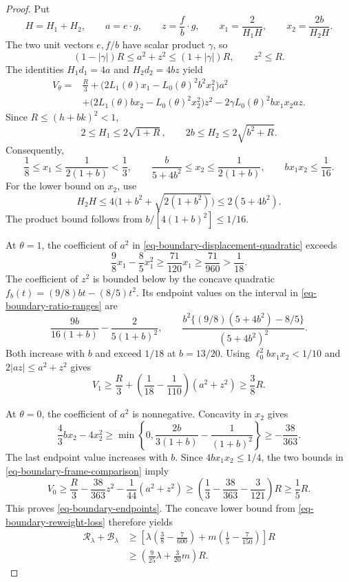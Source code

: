 \documentclass[11pt]{amsart}
\theoremstyle{remark}\newtheorem{remark}[theorem]{Remark}
\numberwithin{equation}{section}
\begin{document}
\begin{proof}
Put
\[
H=H_1+H_2,\qquad a=e\cdot g,\qquad z=\frac fb\cdot g,
\qquad x_1=\frac2{H_1H},\qquad x_2=\frac{2b}{H_2H}.
\]
The two unit vectors $e,f/b$ have scalar product $\gamma$, so
\begin{equation}\label{eq-boundary-frame-comparison}
(1-|\gamma|)R\le a^2+z^2\le(1+|\gamma|)R,
\qquad z^2\le R.
\end{equation}
The identities $H_1d_1=4a$ and $H_2d_2=4bz$ yield
\begin{equation}\label{eq-boundary-displacement-quadratic}
\begin{split}
V_\theta={}&\frac R3+
\bigl(2L_1(\theta)x_1-L_0(\theta)^2b^2x_1^2\bigr)a^2\\
&+\bigl(2L_1(\theta)bx_2-L_0(\theta)^2x_2^2\bigr)z^2
-2\gamma L_0(\theta)^2bx_1x_2az.
\end{split}
\end{equation}
Since $R\le(h+bk)^2<1$,
\[
2\le H_1\le2\sqrt{1+R},\qquad
2b\le H_2\le2\sqrt{b^2+R}.
\]
Consequently,
\begin{equation}\label{eq-boundary-ratio-ranges}
\frac18\le x_1\le\frac1{2(1+b)}<\frac13,\qquad
\frac b{5+4b^2}\le x_2\le\frac1{2(1+b)},\qquad
bx_1x_2\le\frac1{16}.
\end{equation}
For the lower bound on $x_2$, use
\[
H_2H\le4\bigl(1+b^2+\sqrt{2(1+b^2)}\bigr)
\le2(5+4b^2).
\]
The product bound follows from $b/[4(1+b)^2]\le1/16$.

At $\theta=1$, the coefficient of $a^2$ in
\eqref{eq-boundary-displacement-quadratic} exceeds
\[
\frac98x_1-\frac85x_1^2
\ge\frac{71}{120}x_1\ge\frac{71}{960}>\frac1{18}.
\]
The coefficient of $z^2$ is bounded below by the concave quadratic
$f_b(t)=(9/8)bt-(8/5)t^2$. Its endpoint values on the interval
in \eqref{eq-boundary-ratio-ranges} are
\[
\frac{9b}{16(1+b)}-\frac2{5(1+b)^2},\qquad
\frac{b^2\{(9/8)(5+4b^2)-8/5\}}{(5+4b^2)^2}.
\]
Both increase with $b$ and exceed $1/18$ at $b=13/20$.
Using $\ell_0^2bx_1x_2<1/10$ and $2|az|\le a^2+z^2$ gives
\[
V_1\ge\frac R3+
\left(\frac1{18}-\frac1{110}\right)(a^2+z^2)
\ge\frac38R.
\]

At $\theta=0$, the coefficient of $a^2$ is nonnegative. Concavity in
$x_2$ gives
\[
\frac43bx_2-4x_2^2
\ge\min\left\{0,\frac{2b}{3(1+b)}-\frac1{(1+b)^2}\right\}
\ge-\frac{38}{363}.
\]
The last endpoint value increases with $b$.
Since $4bx_1x_2\le1/4$, the two bounds in
\eqref{eq-boundary-frame-comparison} imply
\[
V_0\ge\frac R3-\frac{38}{363}z^2-\frac1{44}(a^2+z^2)
\ge\left(\frac13-\frac{38}{363}-\frac3{121}\right)R
\ge\frac15R.
\]
This proves \eqref{eq-boundary-endpoints}. The concave lower bound
from \eqref{eq-boundary-reweight-loss} therefore yields
\[
\begin{split}
\mathcal R_\lambda+\mathcal B_\lambda
&\ge\left[
\lambda\left(\frac38-\frac7{600}\right)
+m\left(\frac15-\frac7{150}\right)\right]R\\
&\ge\left(\frac9{25}\lambda+\frac3{20}m\right)R.
\end{split}
\]
\end{proof}
\end{document}
